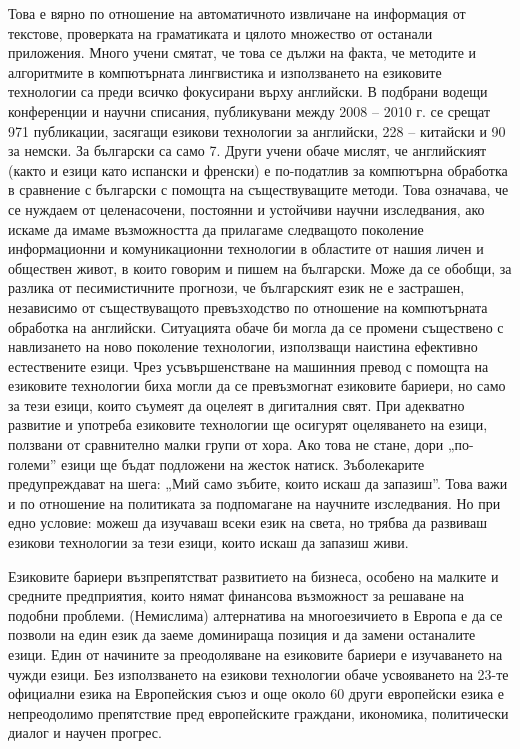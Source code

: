 \begin{multicols}{2}
Това е вярно по отношение на автоматичното извличане на  информация от текстове, проверката на граматиката и цялото множество от останали приложения. Много учени смятат, че това се дължи на факта, че методите и алгоритмите в компютърната лингвистика и използването на езиковите технологии са преди всичко фокусирани върху английски. В подбрани водещи конференции и научни списания, публикувани между 2008 – 2010 г. се срещат 971 публикации, засягащи  езикови технологии за английски, 228 – китайски и  90 за немски. За български са само 7. Други учени обаче мислят, че английският (както и езици като испански и френски) е по-податлив за компютърна обработка в сравнение с български с помощта на съществуващите методи.
Това означава, че се нуждаем от целенасочени, постоянни и устойчиви научни изследвания, ако искаме да имаме възможността да прилагаме следващото поколение информационни и комуникационни технологии в областите от нашия личен и обществен живот, в които говорим и пишем на български. 
Може да се обобщи, за разлика от песимистичните прогнози, че българският език не е застрашен, независимо от съществуващото превъзходство по отношение на компютърната обработка на английски. Ситуацията обаче би могла да се промени съществено с навлизането на ново поколение технологии, използващи наистина ефективно естествените езици. Чрез усъвършенстване на машинния превод с помощта на езиковите технологии биха могли да се превъзмогнат езиковите бариери, но само за тези езици, които съумеят да оцелеят в дигиталния свят. При адекватно развитие и употреба езиковите технологии ще осигурят оцеляването на езици, ползвани от сравнително малки групи от хора. Ако това не стане, дори „по-големи” езици ще бъдат подложени на жесток натиск. 
Зъболекарите предупреждават на шега: „Мий само зъбите, които искаш да запазиш”. Това важи и по отношение на политиката за подпомагане на научните изследвания. Но при едно условие: можеш да изучаваш всеки език на света, но трябва да развиваш езикови технологии за тези езици, които искаш да запазиш живи.


  Езиковите бариери възпрепятстват развитието на бизнеса, особено на малките и средните предприятия, които нямат финансова възможност за решаване на подобни проблеми. (Немислима) алтернатива на многоезичието в Европа е да се позволи на един език да заеме доминираща позиция и да замени останалите езици. Един от начините за преодоляване на езиковите бариери е изучаването на чужди езици. Без използването на езикови технологии обаче усвояването на 23-те официални езика на Европейския съюз и още около 60 други европейски езика е непреодолимо препятствие пред европейските граждани, икономика, политически диалог и научен прогрес.


\end{multicols}
